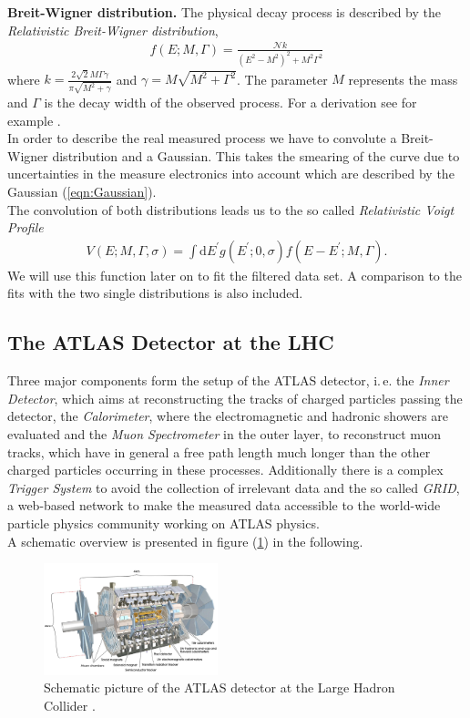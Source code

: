 \documentclass[twocolumn,
			   showpacs,%
               nofootinbib,
               aps,%
               prd,
               notitlepage,
               showkeys,
               10pt]{revtex4-1}
\begin{document}
\textbf{Breit-Wigner distribution.} The physical decay process is described by the \textit{Relativistic Breit-Wigner distribution}, 
\begin{align}
	f(E ; M, \Gamma)=\frac{\mathcal{N} k}{\left(E^{2}-M^{2}\right)^{2}+M^{2} \Gamma^{2}}
\end{align}
where $k=\frac{2 \sqrt{2} M \Gamma \gamma}{\pi \sqrt{M^{2}+\gamma}}$ and $\gamma=M \sqrt{M^{2}+\Gamma^{2}}$. The parameter $M$ represents the mass and $\Gamma$ is the decay width of the observed process. For a derivation see for example \cite{BohmSato2004}. \\

In order to describe the real measured process we have to convolute a Breit-Wigner distribution and a Gaussian. This takes the smearing of the curve due to uncertainties in the measure electronics into account which are described by the Gaussian (\ref{eqn:Gaussian}). \\

The convolution of both distributions leads us to the so called \textit{Relativistic Voigt Profile}
\begin{align}
	V(E ; M, \Gamma, \sigma)=\int \mathrm{d} E^{\prime} g\left(E^{\prime} ; 0, \sigma\right) f\left(E-E^{\prime} ; M, \Gamma\right).
\end{align}
We will use this function later on to fit the filtered data set. A comparison to the fits with the two single distributions is also included. 
\subsection{The ATLAS Detector at the LHC}

Three major components form the setup of the ATLAS detector, i.\,e. the \textit{Inner Detector}, which aims at reconstructing the tracks of charged particles passing the detector, the \textit{Calorimeter}, where the electromagnetic and hadronic showers are evaluated and the \textit{Muon Spectrometer} in the outer layer, to reconstruct muon tracks, which have in general a free path length much longer than the other charged particles occurring in these processes. Additionally there is a complex \textit{Trigger System} to avoid the collection of irrelevant data and the so called \textit{GRID}, a web-based network to make the measured data accessible to the world-wide particle physics community working on ATLAS physics. \\
A schematic overview is presented in figure (\ref{fig:atlas}) in the following.
\begin{figure}[H]
\centering
\includegraphics[width=0.45\textwidth]{figures/introduction/atlas}
\caption[Schematic picture of the ATLAS detector at the LHC.]{Schematic picture of the ATLAS detector at the Large Hadron Collider \cite{ATLAS}.}
\label{fig:atlas}
\end{figure}
\end{document}
